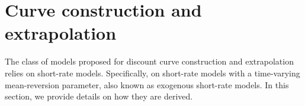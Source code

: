 \nocite{cousin2014}

\section{Curve construction and extrapolation}
\label{curveconstruction}

The class of models proposed for discount curve construction and extrapolation relies on short-rate models. Specifically, on short-rate models with a time-varying mean-reversion parameter, also known as exogenous short-rate models. In this section, we provide details on how they are derived. 

% 
% 

